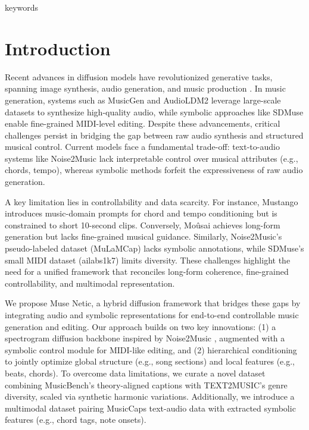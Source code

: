 \documentclass[conference]{IEEEtran}
\begin{document}
\begin{IEEEkeywords}
keywords
\end{IEEEkeywords}

\section{Introduction}
Recent advances in diffusion models have revolutionized generative tasks, spanning image synthesis, audio generation, and music production \cite{huang2024symbolicmusicgenerationnondifferentiable, mariani2024multisourcediffusionmodelssimultaneous}. In music generation, systems such as MusicGen \cite{copet2023simple} and AudioLDM2 \cite{liu2023audioldm} leverage large-scale datasets to synthesize high-quality audio, while symbolic approaches like SDMuse \cite{zhang2022sdmusestochasticdifferentialmusic} enable fine-grained MIDI-level editing. Despite these advancements, critical challenges persist in bridging the gap between raw audio synthesis and structured musical control. Current models face a fundamental trade-off: text-to-audio systems like Noise2Music \cite{huang2023noise2musictextconditionedmusicgeneration} lack interpretable control over musical attributes (e.g., chords, tempo), whereas symbolic methods forfeit the expressiveness of raw audio generation.  

A key limitation lies in controllability and data scarcity. For instance, Mustango \cite{melechovsky2024mustangocontrollabletexttomusicgeneration} introduces music-domain prompts for chord and tempo conditioning but is constrained to short 10-second clips. Conversely, Moûsai \cite{schneider2023mousaitexttomusicgenerationlongcontext} achieves long-form generation but lacks fine-grained musical guidance. Similarly, Noise2Music's pseudo-labeled dataset (MuLaMCap) lacks symbolic annotations, while SDMuse's small MIDI dataset (ailabs1k7) limits diversity. These challenges highlight the need for a unified framework that reconciles long-form coherence, fine-grained controllability, and multimodal representation.  

We propose Muse Netic, a hybrid diffusion framework that bridges these gaps by integrating audio and symbolic representations for end-to-end controllable music generation and editing. Our approach builds on two key innovations: (1) a spectrogram diffusion backbone inspired by Noise2Music \cite{huang2023noise2musictextconditionedmusicgeneration}, augmented with a symbolic control module for MIDI-like editing, and (2) hierarchical conditioning to jointly optimize global structure (e.g., song sections) and local features (e.g., beats, chords). To overcome data limitations, we curate a novel dataset combining MusicBench's theory-aligned captions with TEXT2MUSIC's genre diversity, scaled via synthetic harmonic variations. Additionally, we introduce a multimodal dataset pairing MusicCaps text-audio data with extracted symbolic features (e.g., chord tags, note onsets).  
\end{document}
